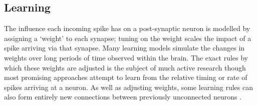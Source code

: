%
%

\subsection{Learning}
The influence each incoming spike has on a post-synaptic neuron is modelled by assigning a `weight' to each synapse;
tuning on the weight scales the impact of a spike
arriving via that synapse.
Many learning models simulate the changes in weights over long periods of time observed within the brain.
The exact rules by which these weights are adjusted is the subject of much active research though most promising approaches attempt to learn from the relative timing \cite{pfister2006triplets} or rate \cite{bienenstock1982theory} of spikes arriving at a neuron.
As well as adjusting weights, some learning rules can also form entirely new connections between previously unconnected
neurons \cite{bamford2010synaptic}.
%
%

